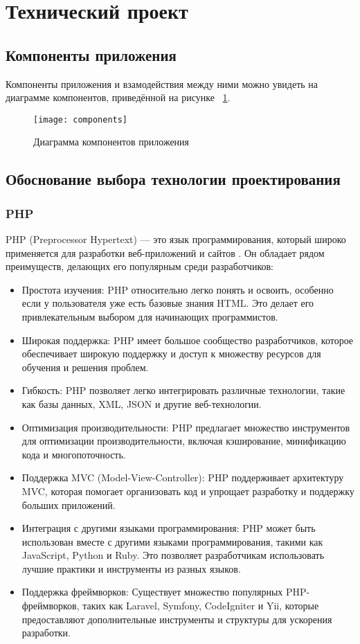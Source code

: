 \section{Технический проект}
\subsection{Компоненты приложения}
Компоненты приложения и взамодействия между ними можно увидеть на диаграмме компонентов, приведённой на рисунке ~\ref{components:image}.
\begin{figure}[h!]
	\texttt{[image: components]}
	\caption{Диаграмма компонентов приложения}
	\label{components:image}
\end{figure}

\subsection{Обоснование выбора технологии проектирования}
\subsubsection{PHP}

PHP (Preprocessor Hypertext) — это язык программирования, который широко применяется для разработки веб-приложений и сайтов \cite{gizbert}. Он обладает рядом преимуществ, делающих его популярным среди разработчиков:
\begin{itemize}
	\item Простота изучения: PHP относительно легко понять и освоить, особенно если у пользователя уже есть базовые знания HTML. Это делает его привлекательным выбором для начинающих программистов.
	\item Широкая поддержка: PHP имеет большое сообщество разработчиков, которое обеспечивает широкую поддержку и доступ к множеству ресурсов для обучения и решения проблем.
	\item Гибкость: PHP позволяет легко интегрировать различные технологии, такие как базы данных, XML, JSON и другие веб-технологии.
	\item Оптимизация производительности: PHP предлагает множество инструментов для оптимизации производительности, включая кэширование, минификацию кода и многопоточность.
	\item Поддержка MVC (Model-View-Controller): PHP поддерживает архитектуру MVC, которая помогает организовать код и упрощает разработку и поддержку больших приложений.
	\item Интеграция с другими языками программирования: PHP может быть использован вместе с другими языками программирования, такими как JavaScript, Python и Ruby. Это позволяет разработчикам использовать лучшие практики и инструменты из разных языков.
	\item Поддержка фреймворков: Существует множество популярных PHP-фреймворков, таких как Laravel, Symfony, CodeIgniter и Yii, которые предоставляют дополнительные инструменты и структуры для ускорения разработки.
\end{itemize}

